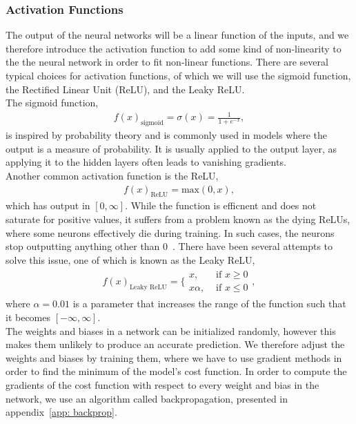 \documentclass[english,notitlepage,reprint,nofootinbib]{revtex4-2}  %
\begin{document}
\subsubsection*{Activation Functions}%
The output of the neural networks will be a linear function of the inputs, and we therefore introduce the activation function to add some kind of non-linearity to the the neural network in order to fit non-linear functions. 
There are several typical choices for activation functions, of which we will use the sigmoid function, the Rectified Linear Unit (ReLU), and the Leaky ReLU. 
\vspace{3mm}
\\ 
The sigmoid function, 
\begin{align}
    f(x)_\text{sigmoid} = \sigma(x) = \frac{1}{1+e^{−x}},
\end{align}
is inspired by probability theory and is commonly used in models where the output is a measure of probability. It is usually applied to the output layer, as applying it to the hidden layers often leads to vanishing gradients. 
\vspace{3mm}
\\ 
Another common activation function is the ReLU, 
\begin{align}
    f(x)_\text{ReLU} = \text{max}(0, x), 
\end{align}
which has output in $[0,\infty]$. 
While the function is efficnent and does not saturate for positive values, it suffers from a problem known as the dying ReLUs, where some neurons effectively die during training. In such cases, the neurons stop outputting anything other than 0~\cite{lecture_notes}. There have been several attempts to solve this issue, one of which is known as the Leaky ReLU, 
\begin{align}
    f(x)_\text{Leaky ReLU} = \bigg\{ 
    \begin{matrix}
        x,       & \text{ if } x \geq 0 \\ 
        x\alpha, & \text{ if } x \leq 0 
    \end{matrix}, 
\end{align}
where $\alpha=0.01$ is a parameter that increases the range of the function such that it becomes $[-\infty, \infty]$. 
\vspace{3mm}
\\ 
The weights and biases in a network can be initialized randomly, however this makes them unlikely to produce an accurate prediction. We therefore adjust the weights and biases by training them, where we have to use gradient methods in order to find the minimum of the model's cost function. In order to compute the gradients of the cost function with respect to every weight and bias in the network, we use an algorithm called backpropagation, presented in appendix~\ref{app: backprop}. 
\end{document}
